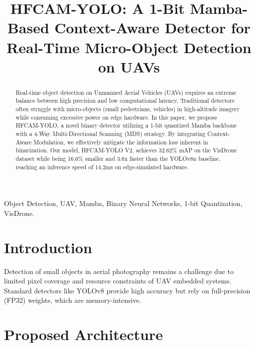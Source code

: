 \documentclass[10pt,conference]{IEEEtran}
\begin{document}
\title{HFCAM-YOLO: A 1-Bit Mamba-Based Context-Aware Detector for Real-Time Micro-Object Detection on UAVs}

\author{
}

\maketitle

\begin{abstract}
Real-time object detection on Unmanned Aerial Vehicles (UAVs) requires an extreme balance between high precision and low computational latency. Traditional detectors often struggle with micro-objects (small pedestrians, vehicles) in high-altitude imagery while consuming excessive power on edge hardware. In this paper, we propose HFCAM-YOLO, a novel binary detector utilizing a 1-bit quantized Mamba backbone with a 4-Way Multi-Directional Scanning (MDS) strategy. By integrating Context-Aware Modulation, we effectively mitigate the information loss inherent in binarization. Our model, HFCAM-YOLO V2, achieves 32.62\% mAP on the VisDrone dataset while being 16.6\% smaller and 3.6x faster than the YOLOv8n baseline, reaching an inference speed of 14.2ms on edge-simulated hardware.
\end{abstract}

\begin{IEEEkeywords}
Object Detection, UAV, Mamba, Binary Neural Networks, 1-bit Quantization, VisDrone.
\end{IEEEkeywords}

\section{Introduction}
Detection of small objects in aerial photography remains a challenge due to limited pixel coverage and resource constraints of UAV embedded systems. Standard detectors like YOLOv8 provide high accuracy but rely on full-precision (FP32) weights, which are memory-intensive. 

\section{Proposed Architecture}
\end{document}
